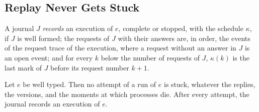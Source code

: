 \documentclass[acmsmall,nonacm,screen]{acmart}
\begin{document}
\subsection{Replay Never Gets Stuck}

\begin{definition}[Recording]
\label{def:records}
A journal $J$ \emph{records} an execution of $e$, complete or stopped, with the schedule
$\kappa$, if $J$ is well formed; the requests of $J$ with their answers are, in order, the
events of the request trace of the execution, where a request without an answer in $J$ is an
open event; and for every $k$ below the number of requests of $J$, $\kappa(k)$ is the last
mark of $J$ before its request number $k + 1$.
\end{definition}

\begin{theorem}
\label{thm:stuck}
Let $e$ be well typed. Then no attempt of a run of $e$ is stuck, whatever the replies, the
versions, and the moments at which processes die. After every attempt, the journal records an
execution of $e$.
\end{theorem}
\end{document}
